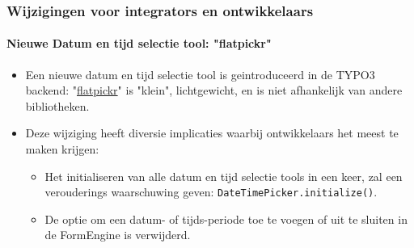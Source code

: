 %

\begin{frame}[fragile]
	\frametitle{Wijzigingen voor integrators en ontwikkelaars}
	\framesubtitle{Nieuwe Datum en tijd selectie tool: "flatpickr"}

	\lstset{basicstyle=\tiny\ttfamily}

	\begin{itemize}
		\item Een nieuwe datum en tijd selectie tool is geintroduceerd in de TYPO3 backend:\newline
			"\href{https://flatpickr.js.org/}{flatpickr}"
			is "klein", lichtgewicht, en is niet afhankelijk van andere bibliotheken.
		\item Deze wijziging heeft diversie implicaties waarbij ontwikkelaars het meest te maken krijgen:

			\begin{itemize}\small
				\item Het initialiseren van alle datum en tijd selectie tools in een keer, zal een verouderings waarschuwing geven:\newline
					\texttt{DateTimePicker.initialize()}.
				\item De optie om een datum- of tijds-periode toe te voegen of uit te sluiten in de FormEngine is verwijderd.
			\end{itemize}

	\end{itemize}

\end{frame}

